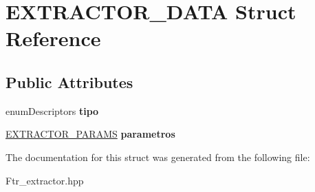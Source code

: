 \hypertarget{struct_e_x_t_r_a_c_t_o_r___d_a_t_a}{\section{E\+X\+T\+R\+A\+C\+T\+O\+R\+\_\+\+D\+A\+T\+A Struct Reference}
\label{struct_e_x_t_r_a_c_t_o_r___d_a_t_a}
}
\subsection*{Public Attributes}
\begin{DoxyCompactItemize}
\item 
\hypertarget{struct_e_x_t_r_a_c_t_o_r___d_a_t_a_ab6fa793ad8bbc0b879b000abb75b9747}{enum\+Descriptors {\bfseries tipo}}\label{struct_e_x_t_r_a_c_t_o_r___d_a_t_a_ab6fa793ad8bbc0b879b000abb75b9747}

\item 
\hypertarget{struct_e_x_t_r_a_c_t_o_r___d_a_t_a_a65f3e7ba03a1182700f4052402035340}{\hyperlink{struct_e_x_t_r_a_c_t_o_r___p_a_r_a_m_s}{E\+X\+T\+R\+A\+C\+T\+O\+R\+\_\+\+P\+A\+R\+A\+M\+S} {\bfseries parametros}}\label{struct_e_x_t_r_a_c_t_o_r___d_a_t_a_a65f3e7ba03a1182700f4052402035340}

\end{DoxyCompactItemize}


The documentation for this struct was generated from the following file\+:\begin{DoxyCompactItemize}
\item 
Ftr\+\_\+extractor.\+hpp\end{DoxyCompactItemize}
